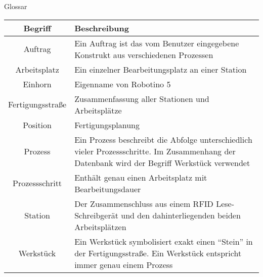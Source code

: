 \documentclass[12pt,  %
  a4paper,            %
  oneside,            %
  BCOR=5mm,           %
  parskip=half,       %
]{scrreprt}
\begin{document}
\newcommand{\inlinetodo}[1]{\todo[inline,linecolor=blue,backgroundcolor=blue!25,bordercolor=blue,size=\normalsize]{#1}}








\newpage

  \vspace{1.5cm}
  \begin{minipage}[b][0cm][b]{\textwidth}
    \fontsize{22pt}{20pt}
    \selectfont
    \begin{center}
      Glossar  	  
  	\end{center}
  \end{minipage}

\renewcommand{\arraystretch}{1.5}
\begin{table}[!ht]
	\centering
	\begin{tabular}{|c|p{10cm}|}
		\hline
		\textbf{Begriff} &	\textbf{Beschreibung} \\
		\hline
    Auftrag & Ein Auftrag ist das vom Benutzer eingegebene Konstrukt aus verschiedenen Prozessen \\
		\hline
    Arbeitsplatz & Ein einzelner Bearbeitungsplatz an einer Station\\
		\hline
    Einhorn & Eigenname von Robotino 5  \\
		\hline
    Fertigungsstraße & Zusammenfassung aller Stationen und Arbeitsplätze  \\
		\hline
    Position & Fertigungsplanung \\
		\hline
    Prozess & Ein Prozess beschreibt die Abfolge unterschiedlich vieler Prozessschritte. Im Zusammenhang der Datenbank wird der Begriff Werkstück verwendet  \\
		\hline
    Prozessschritt & Enthält genau einen Arbeitsplatz mit Bearbeitungsdauer \\
		\hline
    Station & Der Zusammenschluss aus einem RFID Lese- Schreibgerät und den dahinterliegenden beiden Arbeitsplätzen \\
		\hline
    Werkstück & Ein Werkstück symbolisiert exakt einen "`Stein"' in der Fertigungsstraße. Ein Werkstück entspricht immer genau einem Prozess\\
		\hline
	\end{tabular}
	\label{tab:Glossar}
\end{table}
\end{document}
